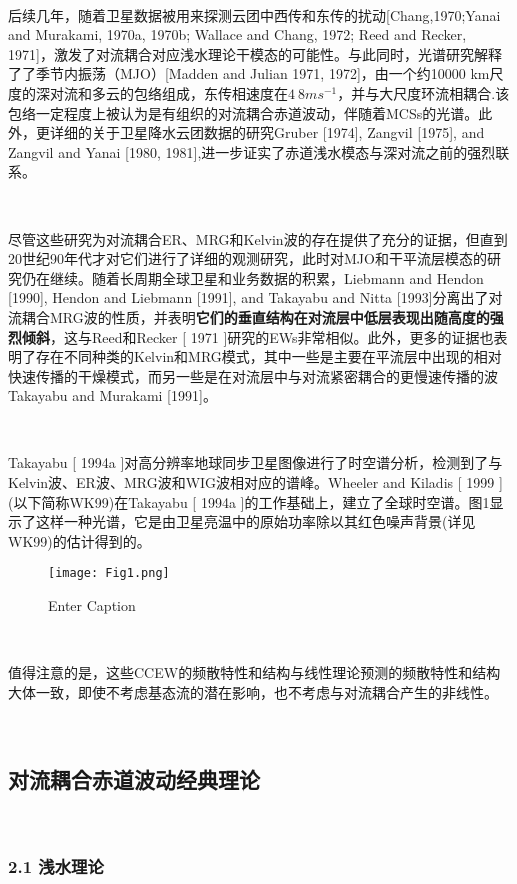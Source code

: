 \documentclass{article}
\begin{document}
\begin{CJK*}{UTF8}{gbsn}
\ 

后续几年，随着卫星数据被用来探测云团中西传和东传的扰动[Chang,1970;Yanai and Murakami, 1970a, 1970b; Wallace and Chang, 1972; Reed and Recker, 1971]，激发了对流耦合对应浅水理论干模态的可能性。与此同时，光谱研究解释了了季节内振荡（MJO）[Madden and Julian 1971, 1972]，由一个约10000 km尺度的深对流和多云的包络组成，东传相速度在$4~8 m s^{-1}$，并与大尺度环流相耦合.该包络一定程度上被认为是有组织的对流耦合赤道波动，伴随着MCSs的光谱。此外，更详细的关于卫星降水云团数据的研究Gruber [1974], Zangvil [1975], and Zangvil and Yanai [1980, 1981],进一步证实了赤道浅水模态与深对流之前的强烈联系。

\ 

尽管这些研究为对流耦合ER、MRG和Kelvin波的存在提供了充分的证据，但直到20世纪90年代才对它们进行了详细的观测研究，此时对MJO和干平流层模态的研究仍在继续。随着长周期全球卫星和业务数据的积累，Liebmann and Hendon [1990], Hendon and Liebmann [1991], and Takayabu and Nitta [1993]分离出了对流耦合MRG波的性质，并表明\textbf{它们的垂直结构在对流层中低层表现出随高度的强烈倾斜}，这与Reed和Recker [ 1971 ]研究的EWs非常相似。此外，更多的证据也表明了存在不同种类的Kelvin和MRG模式，其中一些是主要在平流层中出现的相对快速传播的干燥模式，而另一些是在对流层中与对流紧密耦合的更慢速传播的波Takayabu and Murakami [1991]。

\ 

Takayabu [ 1994a ]对高分辨率地球同步卫星图像进行了时空谱分析，检测到了与Kelvin波、ER波、MRG波和WIG波相对应的谱峰。Wheeler and Kiladis [ 1999 ] (以下简称WK99)在Takayabu [ 1994a ]的工作基础上，建立了全球时空谱。图1显示了这样一种光谱，它是由卫星亮温中的原始功率除以其红色噪声背景(详见WK99)的估计得到的。

\begin{figure}
    \centering
    \texttt{[image: Fig1.png]}
    \caption{Enter Caption}
    \label{fig:enter-label}
\end{figure}

\ 

值得注意的是，这些CCEW的频散特性和结构与线性理论预测的频散特性和结构大体一致，即使不考虑基态流的潜在影响，也不考虑与对流耦合产生的非线性。


\ 


\subsection*{对流耦合赤道波动经典理论}


\ 

\subsubsection*{2.1 浅水理论}



\end{CJK*}
\end{document}
